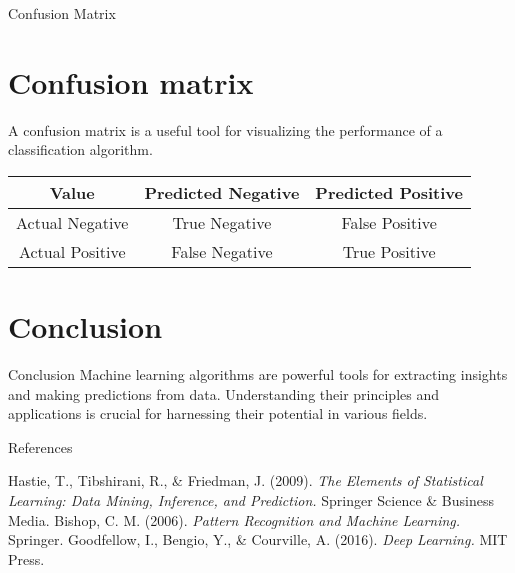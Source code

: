 \documentclass{beamer}
\begin{document}
	\begin{frame}{Confusion Matrix}
		\section{Confusion matrix}
		A confusion matrix is a useful tool for visualizing the performance of a classification algorithm.
		\begin{center}
			\begin{tabular}{ |c | c | c | }
				\hline
				Value & Predicted Negative & Predicted Positive \\      
				\hline
				Actual Negative & True Negative & False Positive \\
				\hline
				Actual Positive & False Negative & True Positive \\
				\hline
			\end{tabular}
		\end{center}
	\end{frame}
	
	\section{Conclusion}
	\begin{frame}{Conclusion}
		Machine learning algorithms are powerful tools for extracting insights and making predictions from data. Understanding their principles and applications is crucial for harnessing their potential in various fields.
	\end{frame}
	
	\begin{frame}{References}
		\begin{thebibliography}{9}
			Hastie, T., Tibshirani, R., \& Friedman, J. (2009). \textit{The Elements of Statistical Learning: Data Mining, Inference, and Prediction.} Springer Science \& Business Media.
			Bishop, C. M. (2006). \textit{Pattern Recognition and Machine Learning.} Springer.
			Goodfellow, I., Bengio, Y., \& Courville, A. (2016). \textit{Deep Learning.} MIT Press.
		\end{thebibliography}
	\end{frame}
	
\end{document}
